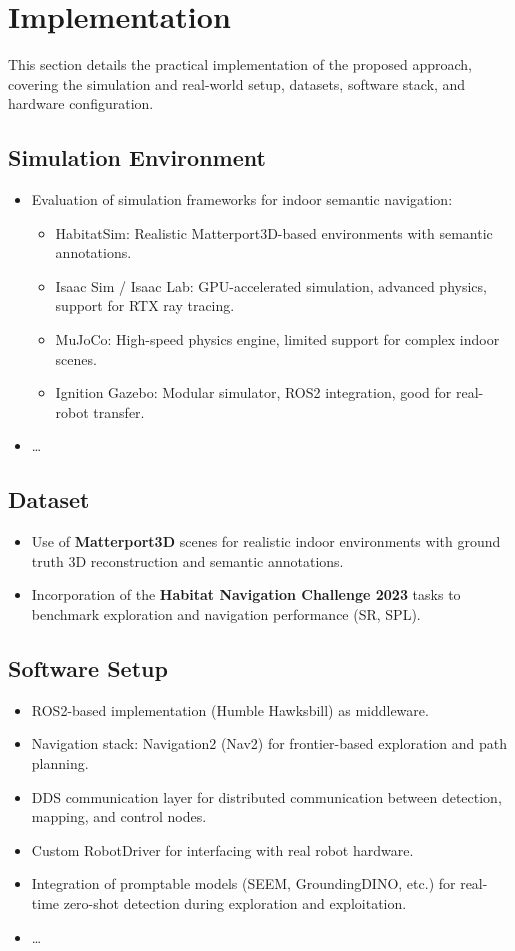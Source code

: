 \chapter{Implementation}
This section details the practical implementation of the proposed approach, covering the simulation and real-world setup, datasets, software stack, and hardware configuration.

\section{Simulation Environment}
\begin{itemize}
    \item Evaluation of simulation frameworks for indoor semantic navigation:
    \begin{itemize}
        \item HabitatSim: Realistic Matterport3D-based environments with semantic annotations.
        \item Isaac Sim / Isaac Lab: GPU-accelerated simulation, advanced physics, support for RTX ray tracing.
        \item MuJoCo: High-speed physics engine, limited support for complex indoor scenes.
        \item Ignition Gazebo: Modular simulator, ROS2 integration, good for real-robot transfer.
    \end{itemize}
    \item \dots
\end{itemize}

\section{Dataset}
\begin{itemize}
    \item Use of \textbf{Matterport3D} scenes for realistic indoor environments with ground truth 3D reconstruction and semantic annotations.
    \item Incorporation of the \textbf{Habitat Navigation Challenge 2023} tasks to benchmark exploration and navigation performance (SR, SPL).
\end{itemize}

\section{Software Setup}
\begin{itemize}
    \item ROS2-based implementation (Humble Hawksbill) as middleware.
    \item Navigation stack: Navigation2 (Nav2) for frontier-based exploration and path planning.
    \item DDS communication layer for distributed communication between detection, mapping, and control nodes.
    \item Custom RobotDriver for interfacing with real robot hardware.
    \item Integration of promptable models (SEEM, GroundingDINO, etc.) for real-time zero-shot detection during exploration and exploitation.
    \item \dots
\end{itemize}

